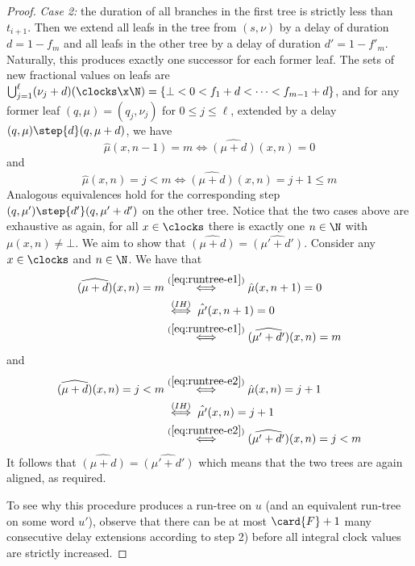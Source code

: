 \begin{proof}
    \smallskip
    \emph{Case 2: } the duration of all branches in the first tree is strictly less than $t_{i+1}$.
    Then we extend all leafs in the tree from $(s,\nu)$ by a delay of duration $d=1-f_m$
    and all leafs in the other tree by a delay of duration $d'=1-f'_m$.
    Naturally, this produces exactly one successor for each former leaf.
    The sets of new fractional values on leafs are
    $\bigcup_{j=1}^\ell(\nu_j+d)(\clocks\x\N) = \{\bot<0<f_1+d<\cdots<f_{m-1}+d\}$,
    and for any former leaf $(q,\mu)= (q_j,\nu_j)$ for $0\le j\le \ell$, extended by a delay $(q,\mu)\step{d}(q,\mu+d)$,
    we have 
    \begin{equation}
        \label{eq:runtree-e1}
        \hat{\mu}(x,n-1) = m \iff \widehat{(\mu+d)}(x,n) = 0
    \end{equation}
    and 
    \begin{equation}
        \label{eq:runtree-e2}
        \hat{\mu}(x,n) = j < m \iff \widehat{(\mu+d)}(x,n) = j+1\le m
    \end{equation}
    Analogous equivalences hold for the corresponding step
    $(q,\mu')\step{d'}(q,\mu'+d')$ on the other tree.
    Notice that the two cases above are exhaustive as 
    again, for all $x\in\clocks$ there is exactly one $n\in\N$ with
    $\mu(x,n)\neq\bot$.
    We aim to show that $\widehat{(\mu+d)}=\widehat{(\mu'+d')}$.
    Consider any $x\in\clocks$ and $n\in\N$. We have that
    \begin{align*}
    \widehat{(\mu+d)}(x,n) = m  %
        &\stackrel{(\ref{eq:runtree-e1})}{\iff}
        \hat{\mu}(x,n+1)=0\\
        &\stackrel{(IH)}{\iff}
        \hat{\mu'}(x,n+1)=0\\
        &\stackrel{(\ref{eq:runtree-e1})}{\iff}
    \widehat{(\mu'+d')}(x,n) = m 
    \end{align*}
    and
    \begin{align*}
    \widehat{(\mu+d)}(x,n)=j < m%
        &\stackrel{(\ref{eq:runtree-e2})}{\iff}
        \hat{\mu}(x,n)=j+1\\
        &\stackrel{(IH)}{\iff}
        \hat{\mu'}(x,n)=j+1\\
        &\stackrel{(\ref{eq:runtree-e2})}{\iff}
        \widehat{(\mu'+d')}(x,n) = j<m
    \end{align*}
    It follows that $\widehat{(\mu+d)}=\widehat{(\mu'+d')}$ which means that the two trees are again aligned, as required.


    To see why this procedure produces a run-tree on $u$ (and an equivalent run-tree on some word $u'$),
    observe that 
    there can be at most $\card{F}+1$ many consecutive delay extensions
    according to step 2) before all integral clock values are strictly increased.
\end{proof}

